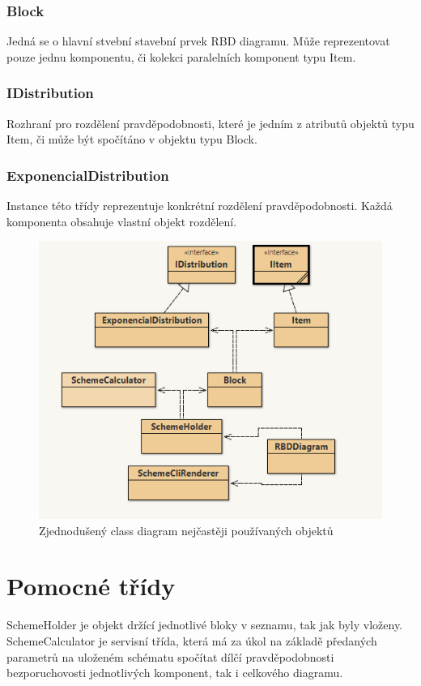 \documentclass[FM,RP]{tulthesis}
\begin{document}
        \subsubsection{Block}
            Jedná se o hlavní stvební stavební prvek RBD diagramu. 
            Může reprezentovat pouze jednu komponentu, či kolekci paralelních komponent typu Item. 
        \subsubsection{IDistribution}
            Rozhraní pro rozdělení pravděpodobnosti, které je jedním z atributů objektů typu Item, či může být spočítáno v objektu typu Block.
        \subsubsection{ExponencialDistribution}
            Instance této třídy reprezentuje konkrétní rozdělení pravděpodobnosti. Každá komponenta obsahuje vlastní objekt rozdělení.

    \begin{figure}[h]
        \centering
        \includegraphics[scale=1]{pic/class.png}
        \caption{Zjednodušený class diagram nejčastěji používaných objektů} \label{Obrázek č. 2.1}
    \end{figure}
    
    \section{Pomocné třídy}
        SchemeHolder je objekt držící jednotlivé bloky v seznamu, tak jak byly vloženy. 
        SchemeCalculator je servisní třída, která má za úkol na základě předaných parametrů na uloženém schématu spočítat dílčí pravděpodobnosti bezporuchovosti jednotlivých komponent,
         tak i celkového diagramu.
\end{document}

